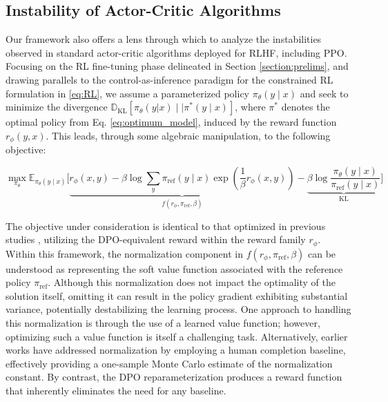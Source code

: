 \subsection{Instability of Actor-Critic Algorithms} Our framework also offers a lens through which to analyze the instabilities observed in standard actor-critic algorithms deployed for RLHF, including PPO. Focusing on the RL fine-tuning phase delineated in Section \ref{section:prelims}, and drawing parallels to the control-as-inference paradigm \cite{levine2018reinforcement} for the constrained RL formulation in \ref{eq:RL}, we assume a parameterized policy $\pi_{\theta}(y\mid x)$ and seek to minimize the divergence $\mathbb{D}_{\text{KL}}[\pi_{\theta}(y|x) \mid \mid \pi^*(y\mid x)]$, where $\pi^*$ denotes the optimal policy from Eq. \ref{eq:optimum_model}, induced by the reward function $r_{\phi}(y, x)$. This leads, through some algebraic manipulation, to the following objective:

\begin{equation}\label{eq:AC}
    \max_{\pi_{\theta}}\mathbb{E}_{\pi_{\theta}(y\mid x)}\bigg[\underbrace{r_{\phi}(x, y) -\beta\log\sum_{y}\pi_\text{ref}(y\mid x)\exp\left(\frac{1}{\beta}r_{\phi}(x, y)\right)}_{f(r_{\phi}, \pi_\text{ref}, \beta)} - \underbrace{\beta\log\frac{\pi_{\theta}(y\mid x)}{\pi_\text{ref}(y\mid x)}}_{\text{KL}}\bigg]
\end{equation}

The objective under consideration is identical to that optimized in previous studies 
\citep{ziegler2020finetuning, stiennon2022learning, bai2022training, ouyang2022training}, utilizing the DPO-equivalent reward within the reward family $r_{\phi}$. Within this framework, the normalization component in $f(r_{\phi}, \pi_\text{ref}, \beta)$ can be understood as representing the soft value function associated with the reference policy $\pi_\text{ref}$. Although this normalization does not impact the optimality of the solution itself, omitting it can result in the policy gradient exhibiting substantial variance, potentially destabilizing the learning process. One approach to handling this normalization is through the use of a learned value function; however, optimizing such a value function is itself a challenging task. Alternatively, earlier works have addressed normalization by employing a human completion baseline, effectively providing a one-sample Monte Carlo estimate of the normalization constant. By contrast, the DPO reparameterization produces a reward function that inherently eliminates the need for any baseline.

